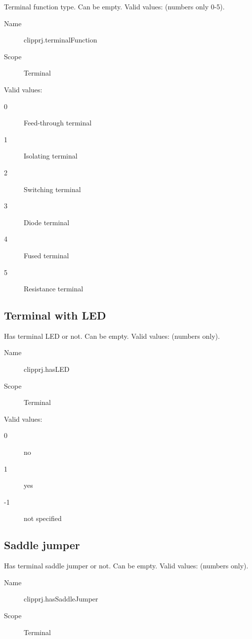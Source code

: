 \documentclass[%
	a4paper,
	oneside,
	listof=numbered,
	parskip=half,
	headsepline=true,
	footsepline=false,
	normalheadings,
	0.7headlines,
	headexclude,
	]{scrbook}
\begin{document}
Terminal function type. Can be empty. Valid values: (numbers only 0-5).

\begin{description}
	\item[Name] clipprj.terminalFunction
	\item[Scope] Terminal
\end{description}

Valid values:

\begin{description}
	\item[0] Feed-through terminal
	\item[1] Isolating terminal
	\item[2] Switching terminal
	\item[3] Diode terminal
	\item[4] Fused terminal
	\item[5] Resistance terminal
\end{description}

\subsection{Terminal with LED}

Has terminal LED or not. Can be empty. Valid values: (numbers only).\\

\begin{description}
	\item[Name] clipprj.hasLED
	\item[Scope] Terminal
\end{description}

Valid values:

\begin{description}
	\item[0] no
	\item[1] yes
	\item[-1] not specified
\end{description}

\subsection{Saddle jumper}

Has terminal saddle jumper or not. Can be empty. Valid values: (numbers only).

\begin{description}
	\item[Name] clipprj.hasSaddleJumper
	\item[Scope] Terminal
\end{description}
\end{document}
